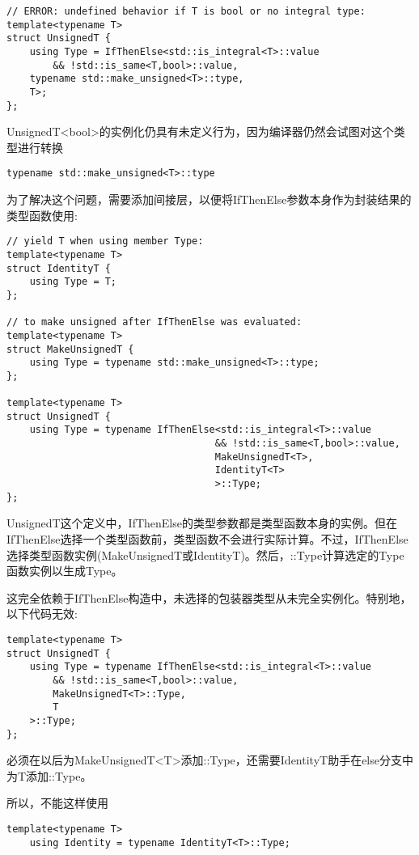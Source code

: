 \begin{lstlisting}[style=styleCXX]
// ERROR: undefined behavior if T is bool or no integral type:
template<typename T>
struct UnsignedT {
	using Type = IfThenElse<std::is_integral<T>::value
		&& !std::is_same<T,bool>::value,
	typename std::make_unsigned<T>::type,
	T>;
};
\end{lstlisting}

UnsignedT<bool>的实例化仍具有未定义行为，因为编译器仍然会试图对这个类型进行转换

\begin{lstlisting}[style=styleCXX]
typename std::make_unsigned<T>::type
\end{lstlisting}

为了解决这个问题，需要添加间接层，以便将IfThenElse参数本身作为封装结果的类型函数使用:

\begin{lstlisting}[style=styleCXX]
// yield T when using member Type:
template<typename T>
struct IdentityT {
	using Type = T;
};

// to make unsigned after IfThenElse was evaluated:
template<typename T>
struct MakeUnsignedT {
	using Type = typename std::make_unsigned<T>::type;
};

template<typename T>
struct UnsignedT {
	using Type = typename IfThenElse<std::is_integral<T>::value
									&& !std::is_same<T,bool>::value,
									MakeUnsignedT<T>,
									IdentityT<T>
									>::Type;
};
\end{lstlisting}

UnsignedT这个定义中，IfThenElse的类型参数都是类型函数本身的实例。但在IfThenElse选择一个类型函数前，类型函数不会进行实际计算。不过，IfThenElse选择类型函数实例(MakeUnsignedT或IdentityT)。然后，::Type计算选定的Type函数实例以生成Type。

这完全依赖于IfThenElse构造中，未选择的包装器类型从未完全实例化。特别地，以下代码无效:

\begin{lstlisting}[style=styleCXX]
template<typename T>
struct UnsignedT {
	using Type = typename IfThenElse<std::is_integral<T>::value
		&& !std::is_same<T,bool>::value,
		MakeUnsignedT<T>::Type,
		T
	>::Type;
};
\end{lstlisting}

必须在以后为MakeUnsignedT<T>添加::Type，还需要IdentityT助手在else分支中为T添加::Type。

所以，不能这样使用

\begin{lstlisting}[style=styleCXX]
template<typename T>
	using Identity = typename IdentityT<T>::Type;
\end{lstlisting}

